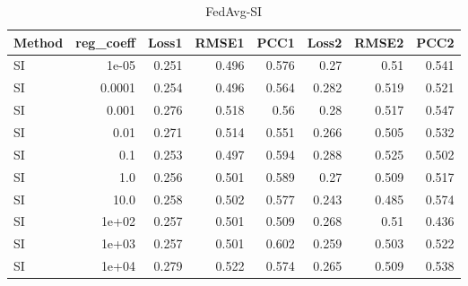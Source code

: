 \begin{table}
\caption{FedAvg-SI}
\begin{tabular}{lrrrrrrr}
\toprule
Method & reg_coeff & Loss1 & RMSE1 & PCC1 & Loss2 & RMSE2 & PCC2 \\
\midrule
SI & 1e-05 & 0.251 & 0.496 & 0.576 & 0.27 & 0.51 & 0.541 \\
SI & 0.0001 & 0.254 & 0.496 & 0.564 & 0.282 & 0.519 & 0.521 \\
SI & 0.001 & 0.276 & 0.518 & 0.56 & 0.28 & 0.517 & 0.547 \\
SI & 0.01 & 0.271 & 0.514 & 0.551 & 0.266 & 0.505 & 0.532 \\
SI & 0.1 & 0.253 & 0.497 & 0.594 & 0.288 & 0.525 & 0.502 \\
SI & 1.0 & 0.256 & 0.501 & 0.589 & 0.27 & 0.509 & 0.517 \\
SI & 10.0 & 0.258 & 0.502 & 0.577 & 0.243 & 0.485 & 0.574 \\
SI & 1e+02 & 0.257 & 0.501 & 0.509 & 0.268 & 0.51 & 0.436 \\
SI & 1e+03 & 0.257 & 0.501 & 0.602 & 0.259 & 0.503 & 0.522 \\
SI & 1e+04 & 0.279 & 0.522 & 0.574 & 0.265 & 0.509 & 0.538 \\
\bottomrule
\end{tabular}
\end{table}
